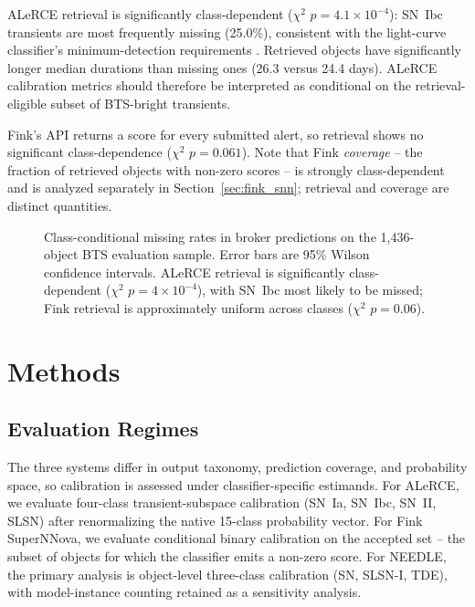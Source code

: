 \documentclass[twocolumn]{aastex631}
\begin{document}
ALeRCE retrieval is significantly class-dependent ($\chi^2$
$p = 4.1 \times 10^{-4}$): SN~Ibc transients are most frequently
missing (25.0\%), consistent with the light-curve classifier's
minimum-detection requirements \citep{sanchezsaez2021}. Retrieved
objects have significantly longer median durations than missing
ones (26.3 versus 24.4 days). ALeRCE calibration metrics should
therefore be interpreted as conditional on the retrieval-eligible
subset of BTS-bright transients.

Fink's API returns a score for every submitted alert, so retrieval
shows no significant class-dependence ($\chi^2$ $p = 0.061$).
Note that Fink \textit{coverage} -- the fraction of retrieved objects
with non-zero scores -- is strongly class-dependent and is analyzed
separately in Section~\ref{sec:fink_snn}; retrieval and coverage
are distinct quantities.

\begin{figure}[t]
\caption{Class-conditional missing rates in broker predictions on the
1{,}436-object BTS evaluation sample. Error bars are 95\% Wilson
confidence intervals. ALeRCE retrieval is significantly class-dependent
($\chi^2$ $p = 4 \times 10^{-4}$), with SN~Ibc most likely to be missed;
Fink retrieval is approximately uniform across classes
($\chi^2$ $p = 0.06$). \label{fig:missingness}}
\end{figure}

\section{Methods} \label{sec:methods}

\subsection{Evaluation Regimes}\label{sec:regimes}

The three systems differ in output taxonomy, prediction coverage,
and probability space, so calibration is assessed under
classifier-specific estimands. For ALeRCE, we evaluate
four-class transient-subspace calibration (SN~Ia, SN~Ibc, SN~II,
SLSN) after renormalizing the native 15-class probability vector.
For Fink SuperNNova, we evaluate conditional binary calibration on
the accepted set -- the subset of objects for which the classifier
emits a non-zero score. For NEEDLE, the primary analysis is
object-level three-class calibration (SN, SLSN-I, TDE), with
model-instance counting retained as a sensitivity analysis.
\end{document}
